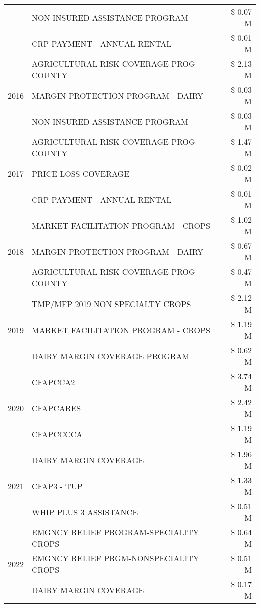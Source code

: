\begin{tabular}{llr}
 & NON-INSURED ASSISTANCE PROGRAM & \$ 0.07 M \\
 & CRP PAYMENT - ANNUAL RENTAL & \$ 0.01 M \\
\cline{1-3}
\multirow[t]{3}{*}{2016} & AGRICULTURAL RISK COVERAGE PROG - COUNTY & \$ 2.13 M \\
 & MARGIN PROTECTION PROGRAM - DAIRY & \$ 0.03 M \\
 & NON-INSURED ASSISTANCE PROGRAM & \$ 0.03 M \\
\cline{1-3}
\multirow[t]{3}{*}{2017} & AGRICULTURAL RISK COVERAGE PROG - COUNTY & \$ 1.47 M \\
 & PRICE LOSS COVERAGE & \$ 0.02 M \\
 & CRP PAYMENT - ANNUAL RENTAL & \$ 0.01 M \\
\cline{1-3}
\multirow[t]{3}{*}{2018} & MARKET FACILITATION PROGRAM - CROPS & \$ 1.02 M \\
 & MARGIN PROTECTION PROGRAM - DAIRY & \$ 0.67 M \\
 & AGRICULTURAL RISK COVERAGE PROG - COUNTY & \$ 0.47 M \\
\cline{1-3}
\multirow[t]{3}{*}{2019} & TMP/MFP 2019 NON SPECIALTY CROPS & \$ 2.12 M \\
 & MARKET FACILITATION PROGRAM - CROPS & \$ 1.19 M \\
 & DAIRY MARGIN COVERAGE PROGRAM & \$ 0.62 M \\
\cline{1-3}
\multirow[t]{3}{*}{2020} & CFAPCCA2 & \$ 3.74 M \\
 & CFAPCARES & \$ 2.42 M \\
 & CFAPCCCCA & \$ 1.19 M \\
\cline{1-3}
\multirow[t]{3}{*}{2021} & DAIRY MARGIN COVERAGE & \$ 1.96 M \\
 & CFAP3 - TUP & \$ 1.33 M \\
 & WHIP PLUS 3 ASSISTANCE & \$ 0.51 M \\
\cline{1-3}
\multirow[t]{3}{*}{2022} & EMGNCY RELIEF PROGRAM-SPECIALITY CROPS & \$ 0.64 M \\
 & EMGNCY RELIEF PRGM-NONSPECIALITY CROPS & \$ 0.51 M \\
 & DAIRY MARGIN COVERAGE & \$ 0.17 M \\
\cline{1-3}
\bottomrule
\end{tabular}
